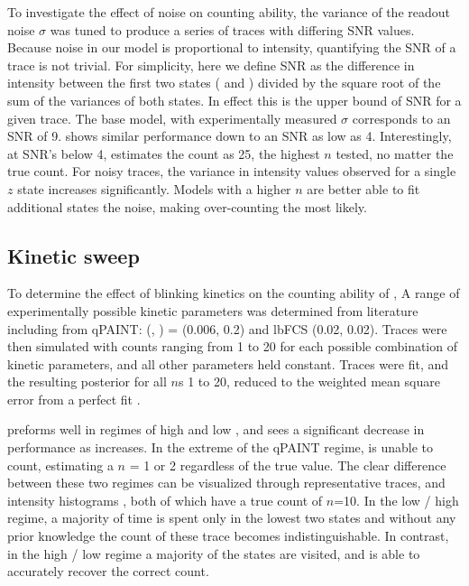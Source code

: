 To investigate the effect of noise on counting ability, the variance of the readout noise $\sigma$ was tuned to produce a 
	series of traces with differing SNR values. 
	Because noise in our model is proportional to intensity, quantifying the SNR of a trace 
	is not trivial. 
	For simplicity, here we define SNR as the difference in intensity between 
	the first two states ( and ) divided by the square root of the sum of the variances of both states. 
	In effect this is the upper bound of SNR for a given trace. 
	The base model, with experimentally measured $\sigma$ corresponds to an SNR of 9. 
	\ours shows similar performance down to an SNR as low as 4. Interestingly, at SNR's below 4, \ours
	estimates the count as 25, the highest $n$ tested, no matter the true count. 
	For noisy traces, the variance in intensity values observed for a single $z$ state increases significantly. 
	Models with a higher $n$ are better able to fit additional states the noise, making over-counting the most likely. 

\subsection{Kinetic sweep}
To determine the effect of blinking kinetics on the counting ability of \ours, 
	A range of experimentally possible kinetic parameters was determined from literature including from 
	qPAINT: (\pon, \poff) = (0.006, 0.2) and lbFCS (0.02, 0.02). 
	Traces were then simulated with counts ranging from 1 to 20 
	for each possible combination of kinetic parameters, and all other parameters held constant. 
	Traces were fit, and the resulting posterior for all $n$s 1 to 20, 
	reduced to the weighted mean square error from a perfect fit .
	
\ours preforms well in regimes of high \pon and low \poff, and sees a significant decrease in performance as \poff
	increases. In the extreme of the qPAINT regime, \ours is unable to count, estimating a $n$ = 1 or 2 regardless of the true value.
	The clear difference between these two regimes can be visualized through representative traces, and intensity histograms ,
	both of which have a true count of $n$=10.
	In the low \pon / high \poff regime, a majority of time is spent only in the lowest two states and without 
	any prior knowledge the count of these trace becomes indistinguishable.
	In contrast, in the high \pon / low \poff regime a majority of the states are visited, and \ours 
	is able to accurately recover the correct count.


